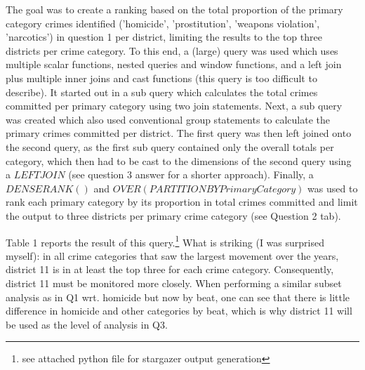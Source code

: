 \documentclass[a4paper]{article}
\begin{document}
The goal was to create a ranking based on the total proportion of the primary category crimes identified ('homicide', 'prostitution', 'weapons violation', 'narcotics') in question 1 per district, limiting the results to the top three districts per crime category. To this end, a (large) query was used which uses multiple scalar functions, nested queries and window functions, and a left join plus multiple inner joins and cast functions (this query is too difficult to describe). It started out in a sub query which calculates the total crimes committed per primary category using two join statements. Next, a sub query was created which also used conventional group statements to calculate the primary crimes committed per district. The first query was then left joined onto the second query, as the first sub query contained only the overall totals per category, which then had to be cast to the dimensions of the second query using a $LEFT JOIN$ (see question 3 answer for a shorter approach). Finally, a $DENSE RANK()$ and $OVER(PARTITION BY PrimaryCategory)$ was used to rank each primary category by its proportion in total crimes committed and limit the output to three districts per primary crime category (see Question 2 tab).

Table 1 reports the result of this query.\footnote{see attached python file for stargazer output generation} What is striking (I was surprised myself): in all crime categories that saw the largest movement over the years, district 11 is in at least the top three for each crime category. Consequently, district 11 must be monitored more closely. When performing a similar subset analysis as in Q1 wrt. homicide but now by beat, one can see that there is little difference in homicide and other categories by beat, which is why district 11 will be used as the level of analysis in Q3. 
\end{document}
